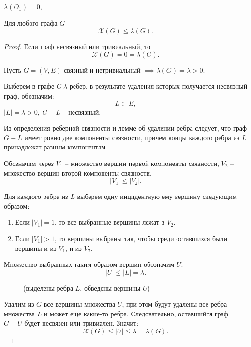 \begin{example}
    $ \lambda(O_1) = 0 $,
    \begin{figure}[H]
        \centering
        \label{fig:fig_28}
    \end{figure}
\end{example}

\begin{theorem}
    Для любого графа $ G $
    \[
        \mathcal{X}(G) \leqslant \lambda(G).
    \]
\end{theorem}

\begin{proof}
    Если граф несвязный или тривиальный, то
    \[
        \mathcal{X}(G) = 0 = \lambda(G).
    \]

    Пусть $ G = (V,E) $ связный и нетривиальный $ \implies \lambda(G) = \lambda > 0 $.

    Выберем в графе $ G \ \lambda $ ребер, в результате удаления которых получается несвязный граф, обозначим:
    \[
        L \subset E,
    \]
    $ | L | = \lambda > 0, \ G - L $ -- несвязный.

    Из определения реберной связности и лемме об удалении ребра следует, что граф $ G - L $ имеет ровно две компоненты связности, причем концы каждого ребра из $ L $ принадлежат разным компонентам.

    Обозначим через $ V_1 $ -- множество вершин первой компоненты связности, $ V_2 $ -- множество вершин второй компоненты связности,
    \[
        | V_1 | \leqslant | V_2 |.
    \]

    Для каждого ребра из $ L $ выберем одну инцидентную ему вершину следующим образом:
    \begin{enumerate}
        \item Если $ | V_1 | = 1 $, то все выбранные вершины лежат в $ V_2 $.
        \item Если $ | V_1 | > 1 $, то вершины выбраны так, чтобы среди оставшихся были вершины и из $ V_1 $, и из $ V_2 $.
    \end{enumerate}

    Множество выбранных таким образом вершин обозначим $ U $.
    \[
        | U | \leqslant | L | = \lambda.
    \]
    \begin{figure}[H]
        \centering
        \caption*{(выделены ребра $ L $, обведены вершины $ U $)}
        \label{fig:fig_29}
    \end{figure}

    Удалим из $ G $ все вершины множества $ U $, при этом будут удалены все ребра множества $ L $ и может еще какие-то ребра. Следовательно, оставшийся граф $ G - U $ будет несвязен или тривиален. Значит:
    \[
        \mathcal{X}(G) \leqslant | U | \leqslant \lambda = \lambda(G).
    \]
\end{proof}


